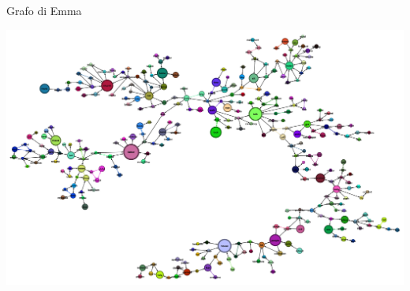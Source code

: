 \documentclass[xcolor=x11names,compress]{beamer}
\begin{document}
{
\begin{frame}[t]{Grafo di Emma}
    \begin{minipage}[t]{\textwidth}
        \centering
        \includegraphics[width=\textwidth]{immagini/emma_ml_lv0}
    \end{minipage}
\end{frame}}
\end{document}
